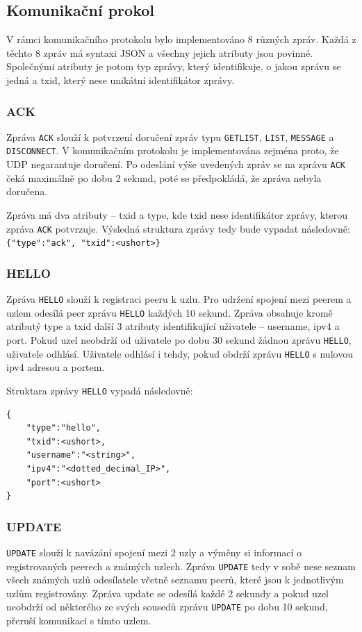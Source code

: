 \documentclass[11pt,a4paper,titlepage]{article}
\begin{document}
        \subsection{Komunikační prokol}
            V rámci komunikačního protokolu bylo implementováno 8 různých zpráv. Každá z těchto 8 zpráv má syntaxi
            JSON a všechny jejich atributy jsou povinné. Společnými atributy je potom typ zprávy, který identifikuje,
            o jakou zprávu se jedná a txid, který nese unikátní identifikátor zprávy.

            \subsubsection{ACK}
                Zpráva \texttt{ACK} slouží k potvrzení doručení zpráv typu \texttt{GETLIST}, \texttt{LIST}, \texttt{MESSAGE} a \texttt{DISCONNECT}.
                V komunikačním protokolu je implementována zejména proto, že UDP negarantuje doručení. Po odeslání výše uvedených zpráv
                se na zprávu \texttt{ACK} čeká maximálně po dobu 2 sekund, poté se předpokládá, že zpráva nebyla doručena.

                Zpráva má dva atributy -- txid a type, kde txid nese identifikátor zprávy, kterou zpráva \texttt{ACK} potvrzuje.
                Výsledná struktura zprávy tedy bude vypadat následovně: \verb+{"type":"ack", "txid":<ushort>}+

            \subsubsection{HELLO}
                Zpráva \texttt{HELLO} slouží k registraci peeru k uzlu. Pro udržení spojení mezi peerem a uzlem odesílá peer zprávu
                \texttt{HELLO} každých 10 sekund. Zpráva obsahuje kromě atributý type a txid další 3 atributy identifikující
                uživatele -- username, ipv4 a port. Pokud uzel neobdrží od uživatele po dobu 30 sekund žádnou zprávu \texttt{HELLO},
                uživatele odhlásí. Uživatele odhlásí i tehdy, pokud obdrží zprávu \texttt{HELLO} s nulovou ipv4 adresou a portem.

                Struktara zprávy \texttt{HELLO} vypadá následovně:
\begin{verbatim}
{
    "type":"hello",
    "txid":<ushort>,
    "username":"<string>",
    "ipv4":"<dotted_decimal_IP>",
    "port":<ushort>
}
\end{verbatim}

            \subsubsection{UPDATE}
                \texttt{UPDATE} slouží k navázání spojení mezi 2 uzly a výměny si informací o registrovaných peerech a známých uzlech. Zpráva
                \texttt{UPDATE} tedy v sobě nese seznam všech známých uzlů odesílatele včetně seznamu peerů, které jsou k jednotlivým uzlům
                registrovány. Zpráva update se odesílá každé 2 sekundy a pokud uzel neobdrží od některého ze svých sousedů zprávu \texttt{UPDATE}
                po dobu 10 sekund, přeruší komunikaci s tímto uzlem.
\end{document}
